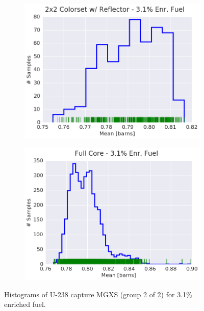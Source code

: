 \begin{figure}[h!]
\begin{subfigure}{0.5\textwidth}
  \includegraphics[width=\linewidth]{figures/patterns/reflector/hist-kde-rug/31-enr-capt-1}  \caption{}
  \label{fig:chap9-hist-reflector-3.1-capt}
\end{subfigure}%
\begin{subfigure}{0.5\textwidth}
  \centering
  \includegraphics[width=\linewidth]{figures/patterns/full-core/hist-kde-rug/31-enr-capt-1} \caption{}
  \label{fig:chap9-hist-full-core-3.1-capt}
\end{subfigure}
\caption[Histogram of U-238 capture MGXS for 3.1\% enriched fuel]{Histograms of U-238 capture \ac{MGXS} (group 2 of 2) for 3.1\% enriched fuel.}
\label{fig:chap9-hist-3.1-capt}
\end{figure}

